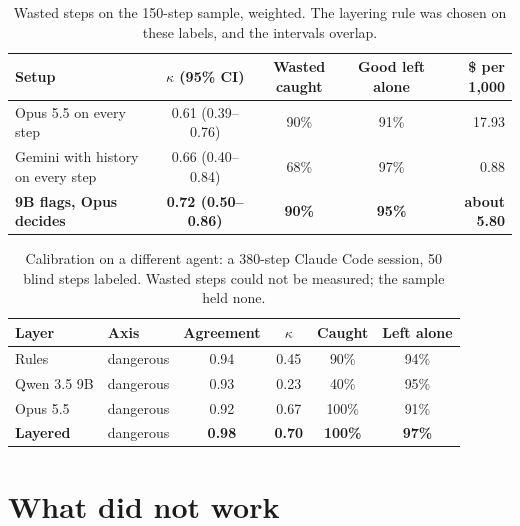 \documentclass[11pt]{article}
\begin{document}
\begin{table}[t]
\centering\small
\begin{tabular}{@{}lcccr@{}}
\toprule
Setup & $\kappa$ (95\% CI) & Wasted caught & Good left alone & \$ per 1,000 \\
\midrule
Opus 5.5 on every step & 0.61 (0.39--0.76) & 90\% & 91\% & 17.93 \\
Gemini with history on every step & 0.66 (0.40--0.84) & 68\% & 97\% & 0.88 \\
\textbf{9B flags, Opus decides} & \textbf{0.72 (0.50--0.86)} & \textbf{90\%} & \textbf{95\%} & \textbf{about 5.80} \\
\bottomrule
\end{tabular}
\caption{Wasted steps on the 150-step sample, weighted. The layering rule was chosen on these labels, and the intervals overlap.}
\label{tab:layered}
\end{table}

\begin{table}[t]
\centering\small
\begin{tabular}{@{}llcccc@{}}
\toprule
Layer & Axis & Agreement & $\kappa$ & Caught & Left alone \\
\midrule
Rules & dangerous & 0.94 & 0.45 & 90\% & 94\% \\
Qwen 3.5 9B & dangerous & 0.93 & 0.23 & 40\% & 95\% \\
Opus 5.5 & dangerous & 0.92 & 0.67 & 100\% & 91\% \\
\textbf{Layered} & dangerous & \textbf{0.98} & \textbf{0.70} & \textbf{100\%} & \textbf{97\%} \\
\bottomrule
\end{tabular}
\caption{Calibration on a different agent: a 380-step Claude Code session, 50 blind steps labeled. Wasted steps could not be measured; the sample held none.}
\label{tab:calibration}
\end{table}

\section{What did not work}
\end{document}
